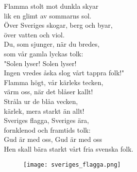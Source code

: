 \documentclass[a6paper,10pt]{article}
\begin{document}
\setlength{\oddsidemargin}{-0.37in}
\begin{center}
\end{center}
\begin{lyrics}
Flamma stolt mot dunkla skyar\\
lik en glimt av sommarns sol.\\
Över Sveriges skogar, berg och byar,\\
över vatten och viol.\\
Du, som sjunger, när du bredes,\\
som vår gamla lyckas tolk:\\
"Solen lyser! Solen lyser!\\
Ingen vredes åska slog vårt tappra folk!"
\vspace{5pt}\\
Flamma högt, vår kärleks tecken,\\
värm oss, när det blåser kallt!\\
Stråla ur de blåa vecken,\\
kärlek, mera starkt än allt!\\
Sveriges flagga, Sveriges ära,\\
fornklenod och framtids tolk:\\
Gud är med oss, Gud är med oss\\
Hen skall bära starkt vårt fria svenska folk. 
\end{lyrics}
\vspace{20pt}
\begin{figure}[!h]
\centering
\texttt{[image: sveriges\_flagga.png]}
\end{figure}
\end{document}
